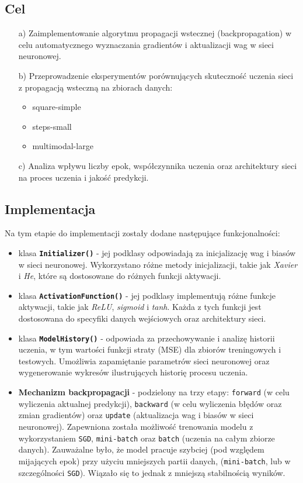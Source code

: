 \documentclass{article}
\begin{document}
\subsection*{Cel}
\begin{enumerate}
    \item[a)] Zaimplementowanie algorytmu propagacji wstecznej (backpropagation) w celu automatycznego wyznaczania gradientów i aktualizacji wag w sieci neuronowej.
    \item[b)] Przeprowadzenie eksperymentów porównujących skuteczność uczenia sieci z propagacją wsteczną na zbiorach danych:
    \begin{itemize}
        \item square-simple
        \item steps-small
        \item multimodal-large
    \end{itemize}
    \item[c)] Analiza wpływu liczby epok, współczynnika uczenia oraz architektury sieci na proces uczenia i jakość predykcji.
\end{enumerate}

\subsection*{Implementacja}
Na tym etapie do implementacji zostały dodane następujące funkcjonalności:
\begin{itemize}
    \item klasa \textbf{\texttt{Initializer()}} - jej podklasy odpowiadają za inicjalizację wag i biasów w sieci neuronowej. Wykorzystano różne metody inicjalizacji, takie jak \textit{Xavier} i \textit{He}, które są dostosowane do różnych funkcji aktywacji.
    \item klasa \textbf{\texttt{ActivationFunction()}} - jej podklasy implementują różne funkcje aktywacji, takie jak \textit{ReLU}, \textit{sigmoid} i \textit{tanh}. Każda z tych funkcji jest dostosowana do specyfiki danych wejściowych oraz architektury sieci.
    \item klasa \textbf{\texttt{ModelHistory()}} - odpowiada za przechowywanie i analizę historii uczenia, w tym wartości funkcji straty (MSE) dla zbiorów treningowych i testowych. Umożliwia zapamiętanie parametrów sieci neuronowej oraz wygenerowanie wykresów ilustrujących historię procesu uczenia.
    \item \textbf{Mechanizm backpropagacji} - podzielony na trzy etapy: \texttt{forward} (w celu wyliczenia aktualnej predykcji), \texttt{backward} (w celu wyliczenia błędów oraz zmian gradientów) oraz \texttt{update} (aktualizacja wag i biasów w sieci neuronowej). Zapewniona została możliwość trenowania modelu z wykorzystaniem \texttt{SGD}, \texttt{mini-batch} oraz \texttt{batch} (uczenia na całym zbiorze danych). Zauważalne było, że model pracuje szybciej (pod względem mijających epok) przy użyciu mniejszych partii danych, (\texttt{mini-batch}, lub w szczególności \texttt{SGD}). Wiązało się to jednak z mniejszą stabilnością wyników.
\end{itemize}
\end{document}
